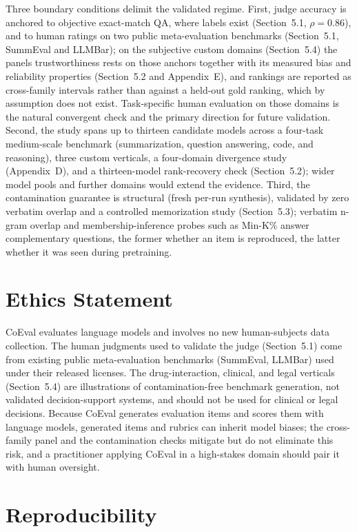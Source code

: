 \documentclass[11pt,a4paper]{article}
\begin{document}
Three boundary conditions delimit the validated regime. First, judge accuracy is anchored to objective exact-match QA,
where labels exist (Section~5.1, \(\rho = 0.86\)), and to human ratings on two public meta-evaluation benchmarks
(Section~5.1, SummEval and LLMBar); on the subjective custom domains (Section~5.4) the panel\textquotesingle s trustworthiness
rests on those anchors together with its measured bias and reliability properties (Section~5.2 and Appendix~E), and
rankings are reported as cross-family intervals rather than against a held-out gold ranking, which by assumption does
not exist. Task-specific human evaluation on those domains is the natural convergent check and the primary direction for
future validation. Second, the study spans up to thirteen candidate models across a four-task medium-scale benchmark
(summarization, question answering, code, and reasoning), three
custom verticals, a four-domain divergence study (Appendix~D), and a thirteen-model rank-recovery check
(Section~5.2); wider model pools and further domains would extend the evidence. Third, the contamination guarantee
is structural (fresh per-run synthesis), validated by zero verbatim overlap and a controlled memorization study
(Section~5.3); verbatim n-gram overlap and membership-inference probes such as Min-K\% \citep{ref36}
answer complementary questions, the former whether an item is reproduced, the latter whether it was seen during
pretraining.

\section*{Ethics Statement}\label{ethics-statement}

CoEval evaluates language models and involves no new human-subjects data collection. The human judgments used to
validate the judge (Section~5.1) come from existing public meta-evaluation benchmarks (SummEval, LLMBar) used
under their released licenses. The drug-interaction, clinical, and legal verticals (Section~5.4) are illustrations
of contamination-free benchmark generation, not validated decision-support systems, and should not be used for clinical
or legal decisions. Because CoEval generates evaluation items and scores them with language models, generated items and
rubrics can inherit model biases; the cross-family panel and the contamination checks mitigate but do not eliminate this
risk, and a practitioner applying CoEval in a high-stakes domain should pair it with human oversight.

\section*{Reproducibility}\label{reproducibility}
\end{document}
